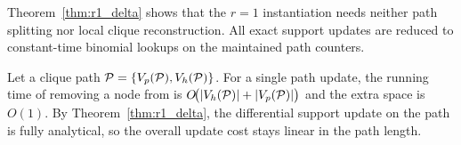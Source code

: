 Theorem~\ref{thm:r1_delta} shows that the $r{=}1$ instantiation needs neither path splitting nor local clique reconstruction.
%
All exact support updates are reduced to constant-time binomial lookups on the maintained path counters.




Let a clique path $\TPath = \{V_p(\TPath), V_h(\TPath)\}$.
For a single path update, the running time of removing a node from \cpi is $O\!\big(|V_h(\TPath)|+|V_p(\TPath)|\big)$ and the extra space is $O(1)$.
%
By Theorem~\ref{thm:r1_delta}, the differential support update on the path is fully analytical, so the overall update cost stays linear in the path length.





